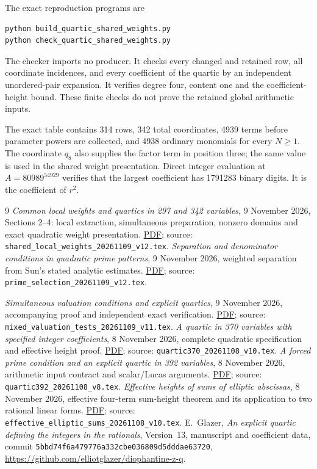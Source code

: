 \documentclass[11pt,a4paper]{article}
\theoremstyle{remark}\newtheorem{remark}[theorem]{Remark}
\begin{document}
The exact reproduction programs are
\begin{verbatim}
python build_quartic_shared_weights.py
python check_quartic_shared_weights.py
\end{verbatim}
The checker imports no producer. It checks every changed and retained
row, all coordinate incidences, and every coefficient of the quartic by
an independent unordered-pair expansion. It verifies degree four,
content one and the coefficient-height bound. These finite checks do
not prove the retained global arithmetic inputs.

The exact table contains 314 rows, 342 total coordinates, 4939 terms
before parameter powers are collected, and 4938 ordinary monomials for
every $N\ge1$. The coordinate $q_8$ also supplies the factor term in position three;
the same value is used in the shared weight presentation.
Direct integer evaluation at $A=80989^{54929}$ verifies that the largest
coefficient has 1791283 binary digits. It is the coefficient of $r^2$.

\begin{thebibliography}{9}
\emph{Common local weights and quartics in 297 and 342 variables},
9 November 2026, Sections 2--4: local extraction, simultaneous preparation,
nonzero domains and exact quadratic weight presentation.
\href{../local_tests/shared_local_weights_20261109_v12.pdf}{PDF};
source: \nolinkurl{shared_local_weights_20261109_v12.tex}.
\emph{Separation and denominator conditions in quadratic prime patterns},
9 November 2026, weighted separation from Sun's stated analytic estimates.
\href{../prime_selection/prime_selection_20261109_v12.pdf}{PDF};
source: \nolinkurl{prime_selection_20261109_v12.tex}.

\emph{Simultaneous valuation conditions and explicit quartics},
9 November 2026, accompanying proof and independent exact verification.
\href{../local_tests/mixed_valuation_tests_20261109_v11.pdf}{PDF}; source: \nolinkurl{mixed_valuation_tests_20261109_v11.tex}.
\emph{A quartic in 370 variables with specified integer coefficients},
8 November 2026, complete quadratic specification and effective height proof.
\href{quartic370_20261108_v10.pdf}{PDF}; source: \nolinkurl{quartic370_20261108_v10.tex}.
\emph{A forced prime condition and an explicit quartic in 392 variables},
8 November 2026, arithmetic input contract and scalar/Lucas arguments.
\href{quartic392_20261108_v8.pdf}{PDF}; source: \nolinkurl{quartic392_20261108_v8.tex}.
\emph{Effective heights of sums of elliptic abscissas}, 8 November 2026,
effective four-term sum-height theorem and its application to two rational
linear forms.
\href{../effective_sums/effective_elliptic_sums_20261108_v10.pdf}{PDF}; source: \nolinkurl{effective_elliptic_sums_20261108_v10.tex}.
E.~Glazer, \emph{An explicit quartic defining the integers in the rationals},
Version~13, manuscript and coefficient data, commit
\nolinkurl{5bbd74f6a479776a332cbe036809d5dddae63720},
\url{https://github.com/elliotglazer/diophantine-z-q}.
\end{thebibliography}
\end{document}
